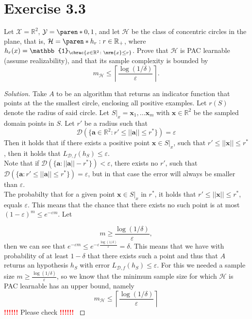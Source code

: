 \documentclass[10pt, a4paper, twoside]{amsart}
\newcommand{\R}{\ensuremath{\mathbb{R}}}
\DeclarePairedDelimiter\cbrac\{\}
\DeclarePairedDelimiter\paren()
\DeclarePairedDelimiter{\nrm}\lVert\rVert
\renewcommand{\c}{\ensuremath{\colon}}
\newcommand{\Ind}{\ensuremath{\mathbb{1}}}
\newenvironment{solution}
               {\let\oldqedsymbol=\qedsymbol
                \renewcommand{\qedsymbol}{$\blacktriangleleft$}
                \begin{proof}[Solution]}
               {\end{proof}
                \renewcommand{\qedsymbol}{\oldqedsymbol}}
\newcommand{\TODO}{\textcolor{red}{\textbf{!!!!!! }}}
\begin{document}
\section*{Exercise 3.3}
Let $\mathcal{X} = \R^2$, $\mathcal{Y} = \paren*{0,1}$, and let $\mathcal{H}$ be the class of concentric circles in the plane, that is, $\mathcal{H}=\paren*{h_r:r \in \R_+}$, where $h_r(x) = \Ind_{\cbrac{x \in \R^2\c\nrm{x} \leq r}}$. Prove that $\mathcal{H}$ is PAC learnable (assume realizability), and that its sample complexity is bounded by
\begin{equation*}
  m_{\mathcal{H}}\leq \left\lceil \frac{\log(1/\delta )}{\varepsilon} \right\rceil .
\end{equation*}
\begin{solution}
  Take $A$ to be an algorithm that returns an indicator function that points at the the smallest circle, enclosing all positive examples. Let $r(S)$ denote the radius of said circle.
  Let $S|_x  = \mathbf{x}_1,\ldots \mathbf{x}_m$ with $\mathbf{x} \in \R^2$ be the sampled domain points in $S$. 
  Let $r'$ be a radius such that
  \begin{equation*}
    \mathcal{D}(\{\mathbf{a} \in \R^2 : r'\leq||\mathbf{a}|| \leq r^*\}) = \varepsilon
  \end{equation*}
  Then it holds that if there exists a positive point $\mathbf{x} \in S|_x$, such that $r' \leq ||\mathbf{x}||\leq r^*$, then it holds that $L_{\mathcal{D},f}(h_S)\leq \varepsilon$.\\
Note that if $\mathcal{D}(\{\mathbf{a}:||\mathbf{a}||-r^{*}\}) < \varepsilon $, there exists no $r'$, such that $\mathcal{D}(\{\mathbf{a}:r'\leq||\mathbf{a}|| \leq r^*\}) = \varepsilon$, but in that case the error will always be smaller than $\varepsilon$.\\
  The probabilty that for a given point $\mathbf{x} \in S|_{x}$ in $r^*$, it holds that $r' \leq ||\mathbf{x}||\leq r^*$, equals $\varepsilon$. This means that the chance that there exists no such point is at most $(1-\varepsilon)^m \leq e^{-\varepsilon m}$. Let

\begin{equation*}
  m \geq \frac{\log(1/\delta)}{\varepsilon},
\end{equation*}
then we can see that $e^{-\varepsilon m} \leq e^{-\varepsilon \frac{\log(1/\delta)}{\varepsilon}} = \delta$. This means that we have with probability of at least $1- \delta$ that there exists such a point and thus that $A$ returns an hypothesis $h_S$ with error $L_{\mathcal{D},f}(h_S) \leq \varepsilon$. For this we needed a sample size $m \geq \frac{\log(1/\delta)}{\varepsilon}$, so we know that the minimum sample size for which $\mathcal{H}$ is PAC learnable has an upper bound, namely 
  \begin{equation*}
    m_{\mathcal{H}}\leq \left\lceil \frac{\log(1/\delta )}{\varepsilon} \right\rceil
  \end{equation*}
  \TODO Please check \TODO
  

\end{solution}
\end{document}
